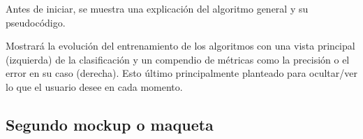 Antes de iniciar, se muestra una explicación del algoritmo general y su pseudocódigo.



Mostrará la evolución del entrenamiento de los algoritmos con una vista
principal (izquierda) de la clasificación y un compendio de métricas como la
precisión o el error en su caso (derecha). Esto último principalmente
planteado para ocultar/ver lo que el usuario desee en cada momento.

\subsection{Segundo mockup o maqueta}

